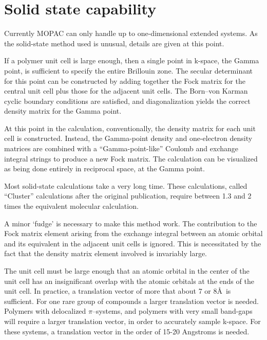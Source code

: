\documentclass[11pt]{book}
\newcommand{\mi}[1]{#1\index{#1}}
\begin{document}
\section{Solid state capability}
   Currently MOPAC can only  handle  up  to  one-dimensional  extended
   systems.   As  the solid-state method used is unusual, details are given
   at this point.

        If a polymer unit cell is large enough,  then  a  single  point  in
   k-space,  the Gamma point, is sufficient to specify the entire Brillouin
   zone.  The secular determinant for this  point  can  be  constructed  by
   adding together the Fock matrix for the central unit cell plus those for
   the adjacent unit cells.  The \mi{Born--von Karman} cyclic boundary conditions
   are satisfied, and diagonalization yields the correct density matrix for
   the Gamma point.

        At this point  in  the  calculation,  conventionally,  the  density
   matrix  for  each  unit  cell  is constructed.  Instead, the Gamma-point
   density  and  one-electron  density  matrices  are   combined   with   a
   ``Gamma-point-like'' Coulomb  and  exchange integral strings to produce a
   new Fock matrix.  The  calculation  can  be  visualized  as  being  done
   entirely in reciprocal space, at the Gamma point.

        Most  solid-state  calculations  take  a  very  long  time.   These
   calculations,   called ``Cluster'' calculations   after  the  original
   publication, require between 1.3 and 2 times  the  equivalent  molecular
   calculation.

        A minor `fudge'  is  necessary  to  make  this  method  work.   The
   contribution  to  the  Fock  matrix  element  arising  from the exchange
   integral between an atomic orbital and its equivalent  in  the  adjacent
   unit  cells  is  ignored.   This  is  necessitated  by the fact that the
   density matrix element involved is invariably large.

        The unit cell must be large enough that an atomic  orbital  in  the
   center  of  the  unit  cell has an insignificant overlap with the atomic
   orbitals at the ends of the  unit  cell.   In  practice,  a  translation
   vector  of more that about 7 or 8\AA\ is sufficient.  For one rare
   group of compounds a larger translation vector is needed.  Polymers with
   delocalized  $\pi$--systems,  and  polymers  with  very small band-gaps will
   require a larger translation  vector,  in  order  to  accurately  sample
   k-space.   For these systems, a translation vector in the order of 
   15-20 Angstroms is needed.
\end{document}
